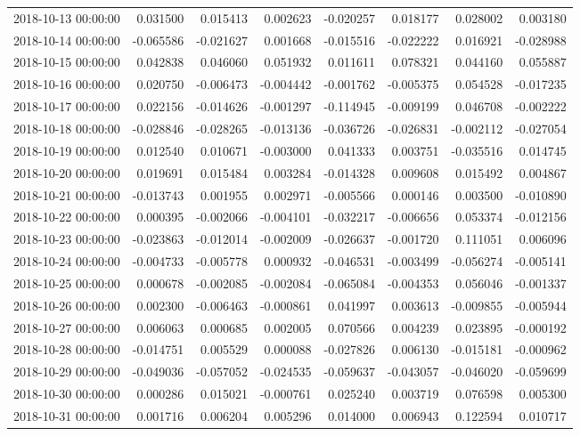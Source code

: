 \begin{tabular}{lrrrrrrr}
2018-10-13 00:00:00 & 0.031500 & 0.015413 & 0.002623 & -0.020257 & 0.018177 & 0.028002 & 0.003180 \\
2018-10-14 00:00:00 & -0.065586 & -0.021627 & 0.001668 & -0.015516 & -0.022222 & 0.016921 & -0.028988 \\
2018-10-15 00:00:00 & 0.042838 & 0.046060 & 0.051932 & 0.011611 & 0.078321 & 0.044160 & 0.055887 \\
2018-10-16 00:00:00 & 0.020750 & -0.006473 & -0.004442 & -0.001762 & -0.005375 & 0.054528 & -0.017235 \\
2018-10-17 00:00:00 & 0.022156 & -0.014626 & -0.001297 & -0.114945 & -0.009199 & 0.046708 & -0.002222 \\
2018-10-18 00:00:00 & -0.028846 & -0.028265 & -0.013136 & -0.036726 & -0.026831 & -0.002112 & -0.027054 \\
2018-10-19 00:00:00 & 0.012540 & 0.010671 & -0.003000 & 0.041333 & 0.003751 & -0.035516 & 0.014745 \\
2018-10-20 00:00:00 & 0.019691 & 0.015484 & 0.003284 & -0.014328 & 0.009608 & 0.015492 & 0.004867 \\
2018-10-21 00:00:00 & -0.013743 & 0.001955 & 0.002971 & -0.005566 & 0.000146 & 0.003500 & -0.010890 \\
2018-10-22 00:00:00 & 0.000395 & -0.002066 & -0.004101 & -0.032217 & -0.006656 & 0.053374 & -0.012156 \\
2018-10-23 00:00:00 & -0.023863 & -0.012014 & -0.002009 & -0.026637 & -0.001720 & 0.111051 & 0.006096 \\
2018-10-24 00:00:00 & -0.004733 & -0.005778 & 0.000932 & -0.046531 & -0.003499 & -0.056274 & -0.005141 \\
2018-10-25 00:00:00 & 0.000678 & -0.002085 & -0.002084 & -0.065084 & -0.004353 & 0.056046 & -0.001337 \\
2018-10-26 00:00:00 & 0.002300 & -0.006463 & -0.000861 & 0.041997 & 0.003613 & -0.009855 & -0.005944 \\
2018-10-27 00:00:00 & 0.006063 & 0.000685 & 0.002005 & 0.070566 & 0.004239 & 0.023895 & -0.000192 \\
2018-10-28 00:00:00 & -0.014751 & 0.005529 & 0.000088 & -0.027826 & 0.006130 & -0.015181 & -0.000962 \\
2018-10-29 00:00:00 & -0.049036 & -0.057052 & -0.024535 & -0.059637 & -0.043057 & -0.046020 & -0.059699 \\
2018-10-30 00:00:00 & 0.000286 & 0.015021 & -0.000761 & 0.025240 & 0.003719 & 0.076598 & 0.005300 \\
2018-10-31 00:00:00 & 0.001716 & 0.006204 & 0.005296 & 0.014000 & 0.006943 & 0.122594 & 0.010717 \\

\end{tabular}
